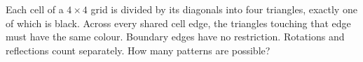 Each cell of a $4\times4$ grid is divided by its diagonals into four triangles, exactly one of which is black. Across every shared cell edge, the triangles touching that edge must have the same colour. Boundary edges have no restriction. Rotations and reflections count separately. How many patterns are possible?
